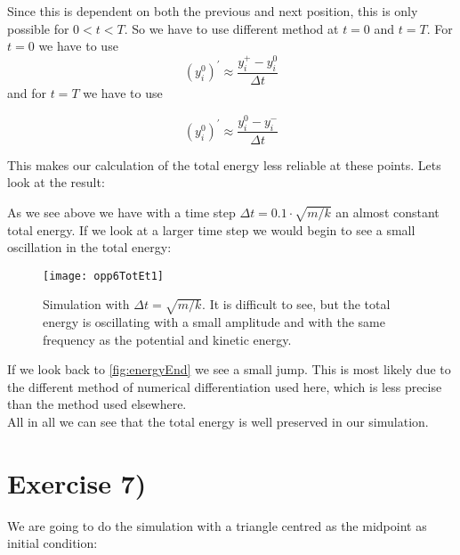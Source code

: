 \documentclass[a4paper,norsk, 10pt]{article}
\begin{document}
Since this is dependent on both the previous and next position, this is only possible for $0 < t < T$. So we have to use different method at $t = 0$ and $t = T$. For $t = 0$ we have to use
\begin{equation}
(y^{0}_i)^{'} \approx \frac{y_{i}^+-y_{i}^0}{\Delta t}
\end{equation}
and for $t = T$ we have to use

\begin{equation}
(y^{0}_i)^{'} \approx \frac{y_{i}^0-y_{i}^-}{\Delta t}
\end{equation}

This makes our calculation of the total energy less reliable at these points. Lets look at the result:

\begin{figure}[H]
\captionsetup[subfigure]{position=b}
\centering
{}
\end{figure}

As we see above we have with a time step $\Delta t= 0.1\cdot \sqrt{m/k}$ an almost constant total energy. If we look at a larger time step we would begin to see a small oscillation in the total energy:

\begin{figure}[H]
\centering
\texttt{[image: opp6TotEt1]}
\caption{Simulation with $\Delta t= \sqrt{m/k}$. It is difficult to see, but the total energy is oscillating with a small amplitude and with the same frequency as the potential and kinetic energy.}
\end{figure}

If we look back to \ref{fig:energyEnd} we see a small jump. This is most likely due to the different method of numerical differentiation used here, which is less precise than the method used elsewhere.\\

All in all we can see that the total energy is well preserved in our simulation.

\section{Exercise 7)}

We are going to do the simulation with a triangle centred as the midpoint as initial condition:
\end{document}
